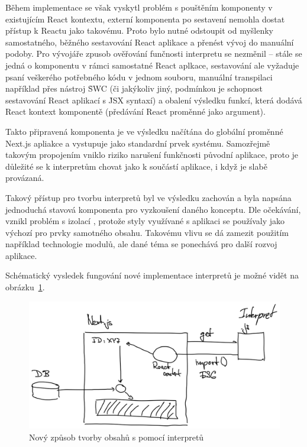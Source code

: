 Během implementace se však vyskytl problém s pouštěním komponenty v existujícím React kontextu, externí komponenta po sestavení nemohla dostat přístup k Reactu jako takovému.
Proto bylo nutné odstoupit od myšlenky samostatného, běžného sestavování React aplikace a přenést vývoj do manuální podoby.
Pro vývojáře zpusob ověřování funčnosti interpretu se nezměnil – stále se jedná o komponentu v rámci samostatné React aplkace, sestavování ale vyžaduje psaní veškerého potřebného kódu v jednom souboru, manuální transpilaci například přes nástroj \h{SWC} (či jakýkoliv jiný, podmínkou je schopnost sestavování React aplikací s \h{JSX} syntaxí) a obalení výsledku funkcí, která dodává React kontext komponentě (předávání React proměnné jako argument).

Takto připravená komponenta je ve výsledku načítána do globální proměnné Next.js apliakce a vystupuje jako standardní prvek systému.
Samozřejmě takovým propojením vniklo riziko narušení funkčnosti původní aplikace, proto je důležité se k interpretům chovat jako k součástí aplikace, i když je slabě provázaná.

Takový přístup pro tvorbu interpretů byl ve výsledku zachován a byla napsána jednoduchá stavová komponenta pro vyzkoušení daného konceptu.
Dle očekávání, vznikl problém s izolací , protože styly využívané s aplikaci se používaly jako výchozí pro prvky samotného obsahu.
Takovému vlivu se dá zamezit použitím například technologie  modulů, ale dané téma se ponechává pro další rozvoj aplikace.

Schématický vysledek fungování nové implementace interpretů je možné vidět na obrázku~\ref{fig:client-interpreter-new}.



\begin{figure}[htbp]
   \centering
   \includegraphics[max width=\textwidth]{assets/draft-interpreters-new}
   \caption{Nový způsob tvorby obsahů s pomocí interpretů}\label{fig:client-interpreter-new}
\end{figure}



